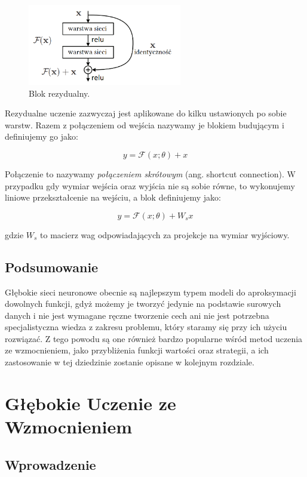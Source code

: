 \documentclass[licencjacka]{pracamgr}
\begin{document}
\begin{figure}[ht!]
  \centering
  \includegraphics[width=0.6\textwidth]{res_block}
  \caption{Blok rezydualny. \cite{resnet}}
\end{figure}

Rezydualne uczenie zazwyczaj jest aplikowane do kilku ustawionych po sobie warstw. Razem z połączeniem od wejścia nazywamy je blokiem budującym i definiujemy go jako:

$$ y = \mathcal{F}(x; \theta) + x $$

Połączenie to nazywamy \emph{połączeniem skrótowym} (ang. shortcut connection). W przypadku gdy wymiar wejścia oraz wyjścia nie są sobie równe, to wykonujemy liniowe przekształcenie na wejściu, a blok definiujemy jako:

$$ y = \mathcal{F}(x; \theta) + W_sx $$

gdzie $W_s$ to macierz wag odpowiadających za projekcje na wymiar wyjściowy.

\section{Podsumowanie}

Głębokie sieci neuronowe obecnie są najlepszym typem modeli do aproksymacji dowolnych funkcji, gdyż możemy je tworzyć jedynie na podstawie surowych danych i nie jest wymagane ręczne tworzenie cech ani nie jest potrzebna specjalistyczna wiedza z zakresu problemu, który staramy się przy ich użyciu rozwiązać. Z tego powodu są one również bardzo popularne wśród metod uczenia ze wzmocnieniem, jako przybliżenia funkcji wartości oraz strategii, a ich zastosowanie w tej dziedzinie zostanie opisane w kolejnym rozdziale.

\chapter{Głębokie Uczenie ze Wzmocnieniem}

\section{Wprowadzenie}
\end{document}
